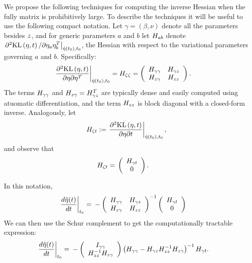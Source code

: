 We propose the following techniques for computing the inverse Hessian when the
fully matrix is prohibitively large.  To describe the techniques it will be
useful to use the following compact notation.  Let $\gamma = (\beta, \nu)$
denote all the parameters besides $z$, and for generic parameters $a$ and $b$
let $H_{ab}$ denote $\left.\partial^2 \mathrm{KL}\left(\eta, t\right) / \partial \eta_a
\eta_b^T\right|_{\hat\eta(t_0), t_0}$, the Hessian with respect to the variational
parameters governing $a$ and $b$.  Specifically:
%
\begin{align*}
%
\fracat{\partial^2 \KL{\eta, \t}}
       {\partial \eta \partial \eta^T}
       {\etaopt(\t_0), \t_0} ={}&
\hess{\zeta\zeta} =
\left(
\begin{array}{cc}
   \hess{\gamma\gamma} & \hess{\gamma\z} \\
   \hess{\z\gamma}     & \hess{\z\z} \\
\end{array}
\right).
%
\end{align*}
%
The terms $H_{\gamma\gamma}$ and $H_{z\gamma} = H_{\gamma z}^T$ are
typically dense and easily computed using atuomatic differentiation, and the
term $H_{zz}$ is block diagonal with a closed-form inverse.
%
Analogously, let
%
\begin{align*}
%
\hess{\zeta\t} :=
\fracat{\partial^2 \KL{\eta, \t}}
       {\partial \eta \partial \t}
       {\etaopt(\t_0), \t_0},
%
\end{align*}
%
and observe that
%
\begin{align*}
%
\hess{\zeta\t} ={}& \left( \begin{array}{c} \hess{\gamma\t} \\ 0 \end{array}\right).
%
\end{align*}

In this notation,
%
\begin{align*}
%
\fracat{d \etaopt(\t)}{d \t}{\t_0} ={}&
-\left(
\begin{array}{cc}
   \hess{\gamma\gamma} & \hess{\gamma\z} \\
   \hess{\z\gamma}     & \hess{\z\z} \\
\end{array}
\right)^{-1}
\left( \begin{array}{c} \hess{\gamma\t} \\ 0 \end{array}\right)
%
\end{align*}
%
We can then use the Schur complement to get the computationally tractable
expression:
%
\begin{align*}
%
\fracat{d \etaopt(\t)}{d \t}{\t_0} ={}&
-\left(\begin{array}{c}
I_{\gamma\gamma} \\
\hess{\z\z}^{-1} \hess{\z\gamma}
\end{array}\right)
\left(\hess{\gamma\gamma} -
      \hess{\gamma\z} \hess{\z\z}^{-1} \hess{\z\gamma}\right)^{-1} \hess{\gamma\t}.
%
\end{align*}

